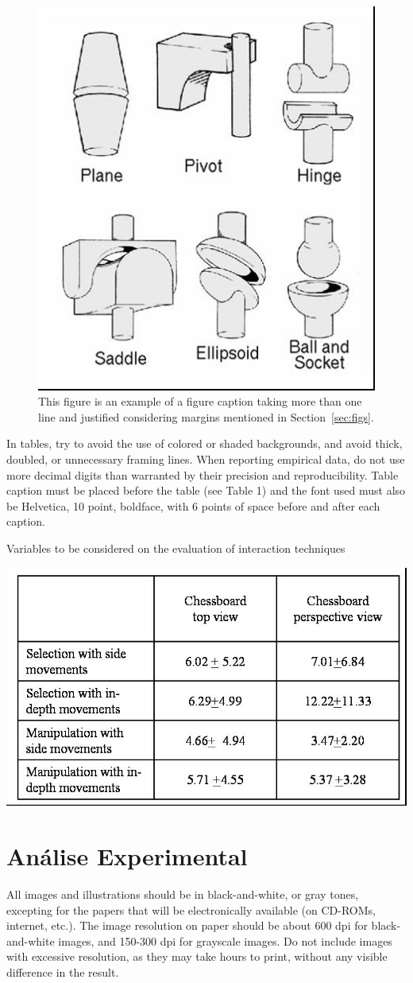 \documentclass[12pt]{article}
\begin{document}
\begin{figure}[ht]
\centering
\includegraphics[width=.3\textwidth]{fig2.jpg}
\caption{This figure is an example of a figure caption taking more than one
  line and justified considering margins mentioned in Section~\ref{sec:figs}.}
\label{fig:exampleFig2}
\end{figure}

In tables, try to avoid the use of colored or shaded backgrounds, and avoid
thick, doubled, or unnecessary framing lines. When reporting empirical data,
do not use more decimal digits than warranted by their precision and
reproducibility. Table caption must be placed before the table (see Table 1)
and the font used must also be Helvetica, 10 point, boldface, with 6 points of
space before and after each caption.

\begin{table}[ht]
\centering
\caption{Variables to be considered on the evaluation of interaction
  techniques}
\label{tab:exTable1}
\includegraphics[width=.7\textwidth]{table.jpg}
\end{table}

\section{Análise Experimental}
\label{sec:experimentos}

All images and illustrations should be in black-and-white, or gray tones,
excepting for the papers that will be electronically available (on CD-ROMs,
internet, etc.). The image resolution on paper should be about 600 dpi for
black-and-white images, and 150-300 dpi for grayscale images.  Do not include
images with excessive resolution, as they may take hours to print, without any
visible difference in the result. 
\end{document}
